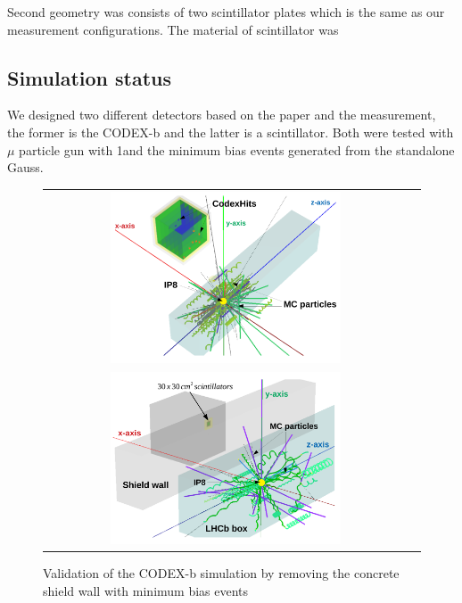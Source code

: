 Second geometry was consists of two scintillator plates which is the same as our measurement configurations.
The material of scintillator was  

\subsection{Simulation status}

We designed two different detectors based on the paper and the measurement, the former is the CODEX-b and the latter is a scintillator.
Both were tested with $\mu$ particle gun with 1\tev and the minimum bias events generated from the standalone Gauss. 

\begin{figure}[h]
\centering
    \begin{tabular}[t]{cc}
    \includegraphics[width=0.65\textwidth]{figs/INT/Minbias.pdf} \\
    \vspace{0.2cm} 
    \includegraphics[width=0.65\textwidth]{figs/INT/Scint.pdf}
    \end{tabular}
\caption{
    Validation of the CODEX-b simulation by removing the concrete shield wall with minimum bias events 
}
\end{figure}

